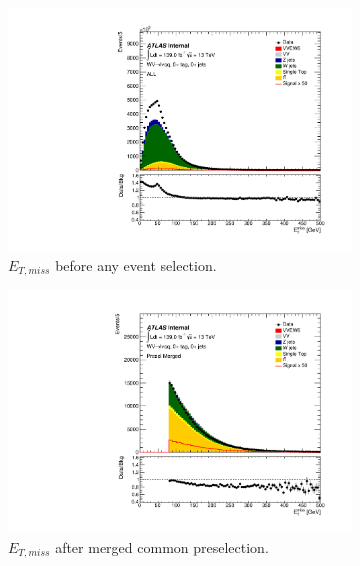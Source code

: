 \begin{figure}[ht]
\centering
        \begin{subfigure}{0.32\textwidth}
            \includegraphics[width=\linewidth]{figures/event_selection/ALL_MET.pdf}
            \caption{$E_{T,miss}$ before any event selection.}
        \end{subfigure}
        \begin{subfigure}{0.32\textwidth}
            \includegraphics[width=\linewidth]{figures/event_selection/Presel_Merged_MET.pdf}
            \caption{$E_{T,miss}$ after merged common preselection.}
        \end{subfigure}
        \begin{subfigure}{0.32\textwidth}

\end{subfigure}
\end{figure}
